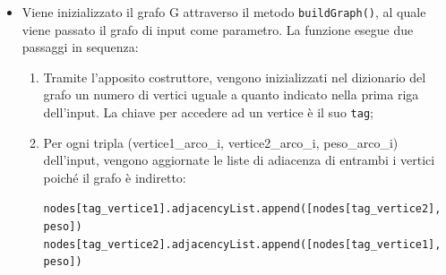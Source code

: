 \begin{itemize}
	\item Viene inizializzato il grafo G attraverso il metodo \texttt{buildGraph()}, al quale viene passato il grafo di input come parametro. La funzione esegue due passaggi in sequenza:
	\begin{enumerate}
		\item Tramite l'apposito costruttore, vengono inizializzati nel dizionario del grafo un numero di vertici uguale a quanto indicato nella prima riga dell'input. La chiave per accedere ad un vertice è il suo \texttt{tag};
		\item Per ogni tripla (vertice1\_arco\_i, vertice2\_arco\_i, peso\_arco\_i) dell'input, vengono aggiornate le liste di adiacenza di entrambi i vertici poiché il grafo è indiretto:
		
		\texttt{nodes[tag\_vertice1].adjacencyList.append([nodes[tag\_vertice2], peso])}
		\texttt{nodes[tag\_vertice2].adjacencyList.append([nodes[tag\_vertice1], peso])}
		

\end{enumerate}
\end{itemize}

